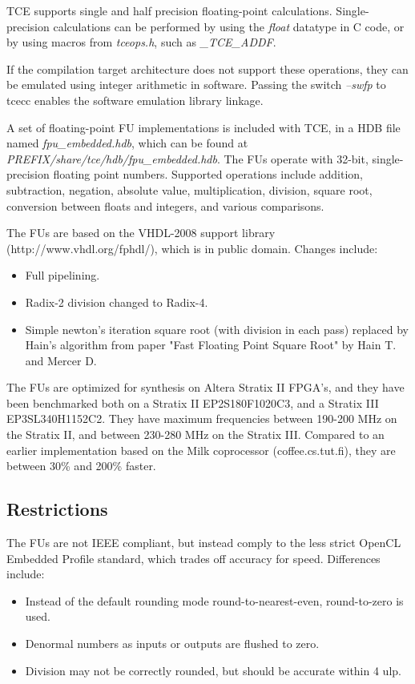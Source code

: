 \documentclass[twoside]{tceusermanual}
\begin{document}
TCE supports single and half precision floating-point calculations. Single-precision calculations
can be performed by using the \emph{float} datatype in C code, or by using macros from 
\emph{tceops.h}, such as \emph{\_TCE\_ADDF}. 

If the compilation target architecture does not support these operations, 
they can be emulated using integer arithmetic in software. Passing the switch \emph{--swfp} 
to tcecc enables the software emulation library linkage.

A set of floating-point FU implementations is included with TCE, in a HDB file named 
\emph{fpu\_embedded.hdb}, which can be found at \emph{PREFIX/share/tce/hdb/fpu\_embedded.hdb}. 
The FUs operate with 32-bit, single-precision floating point numbers. 
Supported operations include addition, subtraction, negation, absolute value, 
multiplication, division, square root, conversion between floats and integers, 
and various comparisons.

The FUs are based on the VHDL-2008 support library (http://www.vhdl.org/fphdl/), 
which is in public domain. Changes include:

\begin{itemize}
 \item Full pipelining.
 \item Radix-2 division changed to Radix-4.
 \item Simple newton's iteration square root (with division in each pass) replaced 
by Hain's algorithm from paper "Fast Floating Point Square Root" by Hain T. and Mercer D.
\end{itemize}

The FUs are optimized for synthesis on Altera Stratix II FPGA's, and they have been 
benchmarked both on a Stratix II EP2S180F1020C3, and a Stratix III 
EP3SL340H1152C2. They have maximum frequencies between 190-200 MHz on the 
Stratix II, and between 230-280 MHz on the Stratix III. 
Compared to an earlier implementation based on the Milk coprocessor 
(coffee.cs.tut.fi), they are between 30\% and 200\% faster.

\subsection{Restrictions}

The FUs are not IEEE compliant, but instead comply to the less strict OpenCL 
Embedded Profile standard, which trades off accuracy for speed. Differences include:

\begin{itemize}
    \item Instead of the default rounding mode round-to-nearest-even, round-to-zero is used.
    \item Denormal numbers as inputs or outputs are flushed to zero.
    \item Division may not be correctly rounded, but should be accurate within 4 ulp.
\end{itemize}
\end{document}
